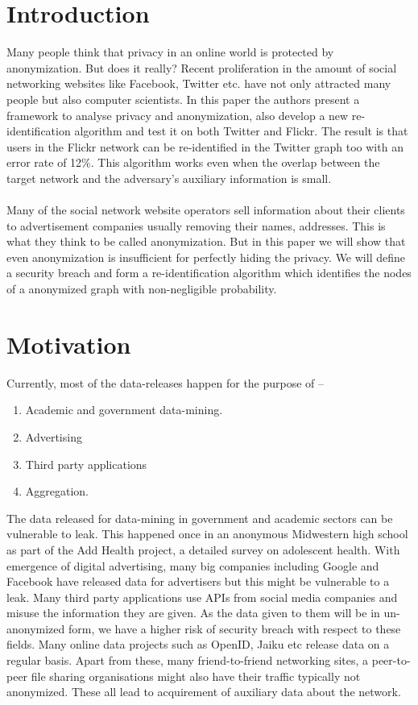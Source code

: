\documentclass[preprint,12pt]{elsarticle}
\theoremstyle{definition}
\theoremstyle{remark}
\begin{document}

\section{Introduction}
\label{S:1}

Many people think that privacy in an online world is protected by anonymization. But does it really? Recent proliferation in the amount of social networking websites like Facebook, Twitter etc. have not only attracted many people but also computer scientists. In this paper the authors present a framework to analyse privacy and anonymization, also develop a new re-identification algorithm and test it on both Twitter and Flickr. The result is that users in the Flickr network can be re-identified in the Twitter graph too with an error rate of 12\%. This algorithm works even when the overlap between the target network and the adversary’s auxiliary information is small.\\ \\
Many of the social network website operators sell information about their clients to advertisement companies usually removing their names, addresses. This is what they think to be called anonymization. But in this paper we will show that even anonymization is insufficient for perfectly hiding the privacy. We will define a security breach and form a re-identification algorithm which identifies the nodes of a anonymized graph with non-negligible probability.

\section{Motivation}

Currently, most of the data-releases happen for the purpose of – 
\begin{enumerate}
\item Academic and government data-mining.
\item Advertising
\item Third party applications
\item Aggregation.
\end{enumerate}

The data released for data-mining in government and academic sectors can be vulnerable to leak. This happened once in an anonymous Midwestern high school as part of the Add Health project, a detailed survey on adolescent health. With emergence of digital advertising, many big companies including Google and Facebook have released data for advertisers but this might be vulnerable to a leak. Many third party applications use APIs from social media companies and misuse the information they are given. As the data given to them will be in un-anonymized form, we have a higher risk of security breach with respect to these fields. Many online data projects such as OpenID, Jaiku etc release data on a regular basis. Apart from these, many friend-to-friend networking sites, a peer-to-peer file sharing organisations might also have their traffic typically not anonymized. These all lead to acquirement of auxiliary data about the network.
\end{document}
